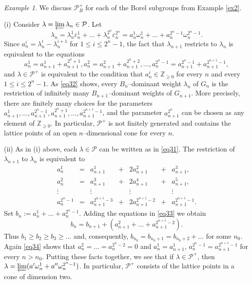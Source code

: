 \documentclass[12pt]{amsart}
\newcommand{\Z}{\mathbf{Z}}
\def\Z{\mathbb{Z}}
\def\cP{\mathcal{P}}
\def\proj{\varprojlim}
\def\vep{\varepsilon}
\theoremstyle{remark}
\newtheorem{example}[equation]{Example}
\begin{document}
\begin{example} \label{ex3}
We discuss $\cP_B^+$ for each of the Borel subgroups from Example \ref{ex2}.

\noindent
(i) Consider $\lambda = \proj \lambda_n \in \cP$. Let 
\begin{equation} \label{eq31}
\lambda_n  =  \lambda_n^1 \vep_n^1 + \ldots + \lambda_n^{2^n} \vep_n^{2^n} 
=  a_n^1 \omega_n^1 + \ldots + a_n^{2^n-1} \omega_n^{2^n-1}.
\end{equation}
Since $a_n^i = \lambda_n^i - \lambda_n^{i+1}$ for $1 \leq i \leq 2^n-1$, 
the fact that $\lambda_{n+1}$ restricts to $\lambda_n$ is 
equivalent to the equations
\begin{equation} \label{eq32}
a_n^1 = a_{n+1}^1 + a_{n+1}^{2^n+1}, a_n^2 = a_{n+1}^2 + a_{n+1}^{2^n+2}, \ldots, 
a_n^{2^n-1} = a_{n+1}^{2^n-1} + a_{n+1}^{2^{n+1}-1},
\end{equation}
and $\lambda \in \cP^+$ is equivalent to the condition that $a_n^i \in \Z_{\geq 0}$ for every $n$ and every $1 \leq i \leq 2^n-1$.
As \eqref{eq32} shows, every $B_n$--dominant weight $\lambda_n$ of $G_n$ is  the restriction of infinitely many 
$B_{n+1}$--dominant weights of $G_{n+1}$. More precisely, there are finitely many choices for the parameters
$a_{n+1}^1, \ldots, a_{n+1}^{2^n-1}, a_{n+1}^{2^n+1}, \ldots, a_{n+1}^{2^{n+1}-1}$,  and the parameter 
$a_{n+1}^{2^n}$ can be chosen as any element of $\Z_{\geq0}$. 
In particular, $\cP^+$ is not finitely generated and contains the lattice points of 
an open $n$--dimensional cone for every $n$.

\noindent
(ii) As in (i) above, each $\lambda \in \cP$ can be written as in \eqref{eq31}. The restriction of $\lambda_{n+1}$ to $\lambda_n$
 is equivalent to
\begin{equation} \label{eq33}
\begin{array}{ccccccc}
a_n^1 & = & a_{n+1}^1 &+& 2 a_{n+1}^2 &+& a_{n+1}^3,\\
a_n^2 & = & a_{n+1}^3 &+& 2 a_{n+1}^4 &+& a_{n+1}^5,\\
\vdots &  &  \vdots &&  \vdots && \vdots\\
a_n^{2^n-1} & = & a_{n+1}^{2^{n+1}-3} & + & 2 a_{n+1}^{2^{n+1}-2} & + & a_{n+1}^{2^{n+1}-1}.
\end{array}
\end{equation}
Set $b_n := a_n^1 + \ldots + a_n^{2^n-1}$. Adding the equations in \eqref{eq33}
we obtain
\begin{equation} \label{eq34}
b_n = b_{n+1} + (a_{n+1}^2 + \ldots + a_{n+1}^{2^{n+1}-2}).
\end{equation}
Thus $b_1 \geq b_2 \geq b_3 \geq \ldots$ and, consequently, $b_{n_0} = b_{n_0+1} = b_{n_0 +2} + \dots$ for
some $n_0$.  Again \eqref{eq34} shows that $a_n^2 = \ldots = a_n^{2^n-2} = 0$ and $a_n^1 = a_{n+1}^1$, $a_n^{2^n-1} =
a_{n+1}^{2^{n+1}-1}$ for every $n > n_0$. Putting these facts together, we see that if $\lambda \in \cP^+$, then
$\lambda = \proj (a' \omega_n^1 + a'' \omega_n^{2^n-1})$. In particular, $\cP^+$ consists of the lattice points in a cone of
dimension two.



\end{example}
\end{document}
